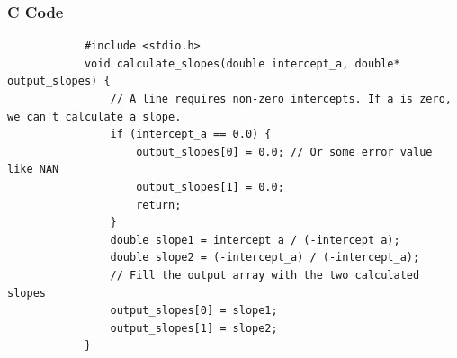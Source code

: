 \documentclass{beamer}
\begin{document}
	\begin{frame}[fragile]
		\frametitle{C Code}
		
		\begin{lstlisting}
			#include <stdio.h>
			void calculate_slopes(double intercept_a, double* output_slopes) {
				// A line requires non-zero intercepts. If a is zero, we can't calculate a slope.
				if (intercept_a == 0.0) {
					output_slopes[0] = 0.0; // Or some error value like NAN
					output_slopes[1] = 0.0;
					return;
				}
				double slope1 = intercept_a / (-intercept_a);
				double slope2 = (-intercept_a) / (-intercept_a);
				// Fill the output array with the two calculated slopes
				output_slopes[0] = slope1;
				output_slopes[1] = slope2;
			}
		\end{lstlisting}
	\end{frame}
	
\end{document}
